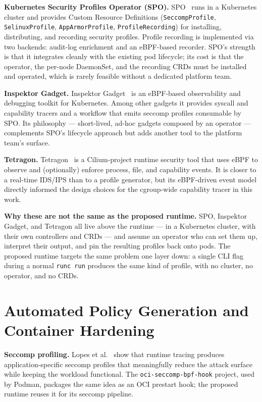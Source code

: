\textbf{Kubernetes Security Profiles Operator (SPO).} SPO~\cite{spo2025} runs in a Kubernetes cluster and provides Custom Resource Definitions (\texttt{SeccompProfile}, \texttt{SelinuxProfile}, \texttt{AppArmorProfile}, \texttt{ProfileRecording}) for installing, distributing, and recording security profiles. Profile recording is implemented via two backends: audit-log enrichment and an eBPF-based recorder. SPO's strength is that it integrates cleanly with the existing pod lifecycle; its cost is that the operator, the per-node DaemonSet, and the recording CRDs must be installed and operated, which is rarely feasible without a dedicated platform team.

\textbf{Inspektor Gadget.} Inspektor Gadget~\cite{inspektorgadget2025} is an eBPF-based observability and debugging toolkit for Kubernetes. Among other gadgets it provides syscall and capability tracers and a workflow that emits seccomp profiles consumable by SPO. Its philosophy --- short-lived, ad-hoc gadgets composed by an operator --- complements SPO's lifecycle approach but adds another tool to the platform team's surface.

\textbf{Tetragon.} Tetragon~\cite{tetragon2025} is a Cilium-project runtime security tool that uses eBPF to observe and (optionally) enforce process, file, and capability events. It is closer to a real-time IDS/IPS than to a profile generator, but its eBPF-driven event model directly informed the design choices for the cgroup-wide capability tracer in this work.

\textbf{Why these are not the same as the proposed runtime.} SPO, Inspektor Gadget, and Tetragon all live above the runtime --- in a Kubernetes cluster, with their own controllers and CRDs --- and assume an operator who can set them up, interpret their output, and pin the resulting profiles back onto pods. The proposed runtime targets the same problem one layer down: a single CLI flag during a normal \texttt{runc run} produces the same kind of profile, with no cluster, no operator, and no CRDs.

\section{Automated Policy Generation and Container Hardening}

\textbf{Seccomp profiling.} Lopes et al.~\cite{lopes2020} show that runtime tracing produces application-specific seccomp profiles that meaningfully reduce the attack surface while keeping the workload functional. The \texttt{oci-seccomp-bpf-hook} project, used by Podman, packages the same idea as an OCI prestart hook; the proposed runtime reuses it for its seccomp pipeline.

